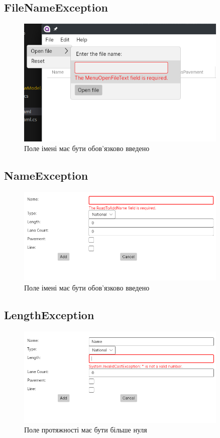 \documentclass[14pt]{extarticle}
\begin{document}
\subsection{FileNameException}
\begin{figure}[H]
    \centering
    \includegraphics[width=0.90\textwidth]{on_file_open_click_exception.png}
    \caption{Поле імені має бути обов'язково введено}
\end{figure}
\subsection{NameException}
\begin{figure}[H]
    \centering
    \includegraphics[width=0.90\textwidth]{name_exception.png}
    \caption{Поле імені має бути обов'язково введено}
\end{figure}
\subsection{LengthException}
\begin{figure}[H]
    \centering
    \includegraphics[width=0.90\textwidth]{length_exception.png}
    \caption{Поле протяжності має бути більше нуля}
\end{figure}
\end{document}
